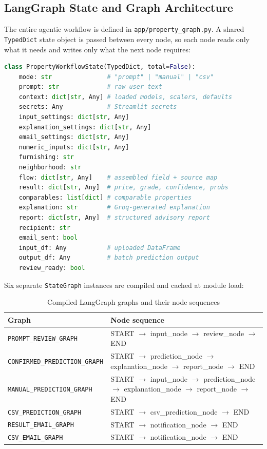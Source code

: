 \documentclass[12pt,a4paper]{article}
\begin{document}
\subsection{LangGraph State and Graph Architecture}

The entire agentic workflow is defined in \texttt{app/property\_graph.py}. A shared \texttt{TypedDict} state object is passed between every node, so each node reads only what it needs and writes only what the next node requires:

\begin{lstlisting}[language=Python, caption={PropertyWorkflowState TypedDict definition (property\_graph.py)}]
class PropertyWorkflowState(TypedDict, total=False):
    mode: str               # "prompt" | "manual" | "csv"
    prompt: str             # raw user text
    context: dict[str, Any] # loaded models, scalers, defaults
    secrets: Any            # Streamlit secrets
    input_settings: dict[str, Any]
    explanation_settings: dict[str, Any]
    email_settings: dict[str, Any]
    numeric_inputs: dict[str, Any]
    furnishing: str
    neighborhood: str
    flow: dict[str, Any]    # assembled field + source map
    result: dict[str, Any]  # price, grade, confidence, probs
    comparables: list[dict] # comparable properties
    explanation: str        # Groq-generated explanation
    report: dict[str, Any]  # structured advisory report
    recipient: str
    email_sent: bool
    input_df: Any           # uploaded DataFrame
    output_df: Any          # batch prediction output
    review_ready: bool
\end{lstlisting}

Six separate \texttt{StateGraph} instances are compiled and cached at module load:

\begin{table}[H]
\centering
\caption{Compiled LangGraph graphs and their node sequences}
\renewcommand{\arraystretch}{1.3}
\begin{tabularx}{\textwidth}{p{5.8cm}X}
\toprule
\textbf{Graph} & \textbf{Node sequence} \\
\midrule
\texttt{PROMPT\_REVIEW\_GRAPH}        & START $\to$ input\_node $\to$ review\_node $\to$ END \\
\texttt{CONFIRMED\_PREDICTION\_GRAPH} & START $\to$ prediction\_node $\to$ explanation\_node $\to$ report\_node $\to$ END \\
\texttt{MANUAL\_PREDICTION\_GRAPH}    & START $\to$ input\_node $\to$ prediction\_node $\to$ explanation\_node $\to$ report\_node $\to$ END \\
\texttt{CSV\_PREDICTION\_GRAPH}       & START $\to$ csv\_prediction\_node $\to$ END \\
\texttt{RESULT\_EMAIL\_GRAPH}         & START $\to$ notification\_node $\to$ END \\
\texttt{CSV\_EMAIL\_GRAPH}            & START $\to$ notification\_node $\to$ END \\
\bottomrule
\end{tabularx}
\end{table}
\end{document}
